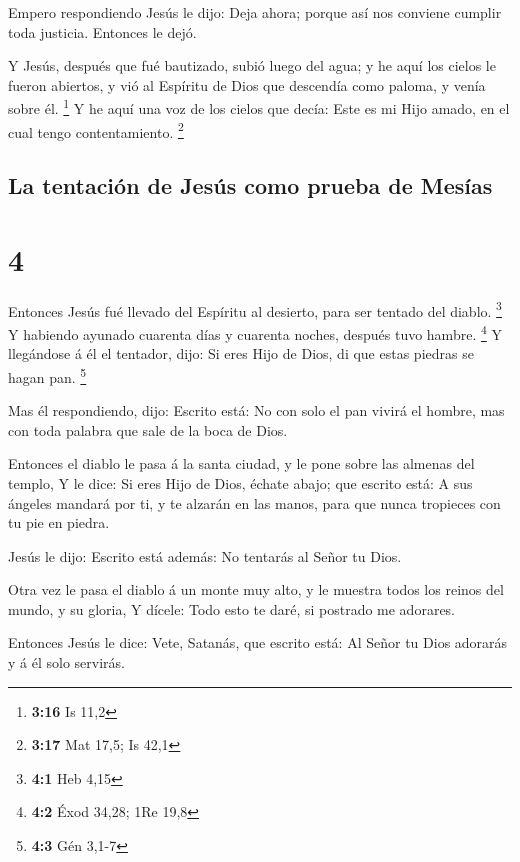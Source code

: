  Empero respondiendo Jesús le dijo: Deja ahora; porque
así nos conviene cumplir toda justicia. Entonces le dejó.

 Y Jesús, después que fué bautizado, subió luego del
agua; y he aquí los cielos le fueron abiertos, y vió al Espíritu de Dios
que descendía como paloma, y venía sobre él. \footnote{\textbf{3:16} Is
  11,2}  Y he aquí una voz de los cielos que decía: Este
es mi Hijo amado, en el cual tengo contentamiento. \footnote{\textbf{3:17}
  Mat 17,5; Is 42,1}

\hypertarget{la-tentaciuxf3n-de-jesuxfas-como-prueba-de-mesuxedas}{%
\subsection{La tentación de Jesús como prueba de
Mesías}\label{la-tentaciuxf3n-de-jesuxfas-como-prueba-de-mesuxedas}}

\hypertarget{section-3}{%
\section{4}\label{section-3}}

 Entonces Jesús fué llevado del Espíritu al desierto, para
ser tentado del diablo. \footnote{\textbf{4:1} Heb 4,15} 
Y habiendo ayunado cuarenta días y cuarenta noches, después tuvo hambre.
\footnote{\textbf{4:2} Éxod 34,28; 1Re 19,8}  Y llegándose
á él el tentador, dijo: Si eres Hijo de Dios, di que estas piedras se
hagan pan. \footnote{\textbf{4:3} Gén 3,1-7}

 Mas él respondiendo, dijo: Escrito está: No con solo el
pan vivirá el hombre, mas con toda palabra que sale de la boca de Dios.

 Entonces el diablo le pasa á la santa ciudad, y le pone
sobre las almenas del templo,  Y le dice: Si eres Hijo de
Dios, échate abajo; que escrito está: A sus ángeles mandará por ti, y te
alzarán en las manos, para que nunca tropieces con tu pie en piedra.

 Jesús le dijo: Escrito está además: No tentarás al Señor
tu Dios.

 Otra vez le pasa el diablo á un monte muy alto, y le
muestra todos los reinos del mundo, y su gloria,  Y
dícele: Todo esto te daré, si postrado me adorares.

 Entonces Jesús le dice: Vete, Satanás, que escrito está:
Al Señor tu Dios adorarás y á él solo servirás.

